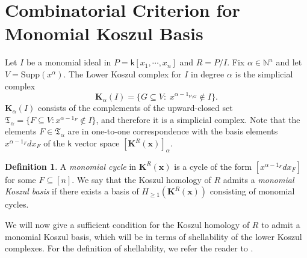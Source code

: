 \documentclass[10pt,reqno]{amsart}
\newtheorem{lemma}[subsection]{Lemma}
\theoremstyle{definition}
\newtheorem{definition}[subsection]{Definition}
\theoremstyle{remark}
\numberwithin{equation}{section}
\newcommand{\kk}{\mathsf k}
\newcommand{\m}{\mathfrak m}
\numberwithin{equation}{section}
\begin{document}
\section{Combinatorial Criterion for Monomial Koszul Basis}

Let $I$ be a monomial ideal in $P=\kk[x_1,\cdots,x_n]$ and $R=P/I$. Fix $\alpha\in \mathbb{N}^n$ and let $V=\mathrm{Supp}(x^{\alpha})$. The Lower Koszul complex for $I$ in degree $\alpha$ is  the simplicial complex \[\mathbf{K}_{\alpha}(I)=\{G\subseteq V:\; x^{\alpha-1_{V\setminus G}}\notin I\}.\]  $\mathbf{K}_{\alpha}(I)$ consists of the complements of the upward-closed set $\mathfrak T_{\alpha}= \{F\subseteq V: x^{\alpha-1_F}\notin I \}$, and therefore it is a simplicial complex. Note that the  elements $F\in\mathfrak T_{\alpha}$ are in one-to-one correspondence with the basis elements $x^{\alpha-1_{F}}dx_F$ of the $\kk$ vector space $[\mathbf{K}^{R}(\mathbf{x})]_{\alpha}$.
\begin{definition}
A {\em monomial cycle} in $\mathbf{K}^{R}(\mathbf{x})$ is a cycle of the form $[x^{\alpha-1_F}dx_F]$
for some $F\subseteq [n]$. 
We say that the Koszul homology of $R$ admits a {\em monomial Koszul basis} if there exists a basis of $H_{\ge 1}(\mathbf{K}^{R}(\mathbf{x}))$ consisting of monomial cycles. 
    
\end{definition}

We will now give a sufficient condition for the Koszul homology of $R$ to admit a monomial Koszul basis, which will be in terms of shellability of the lower Koszul complexes. For the definition of shellability, we refer the reader to \cite{bjorner1996shellable}.


\end{document}
